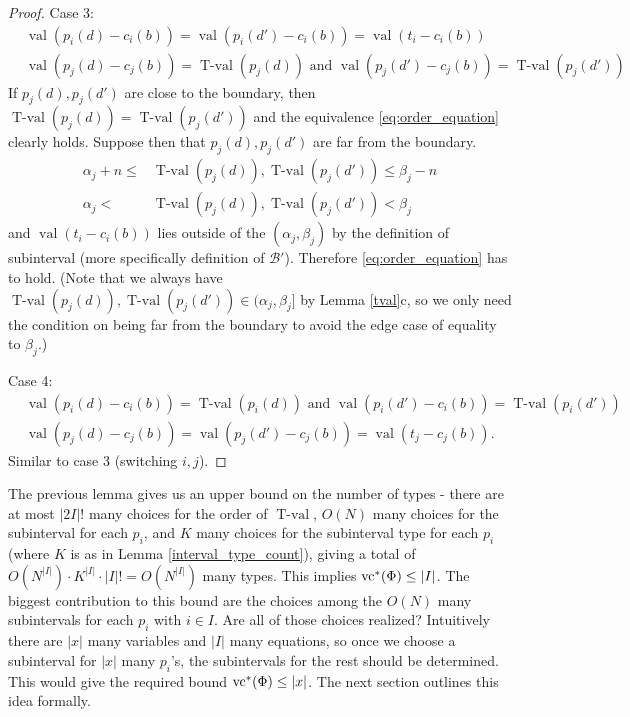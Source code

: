 \documentclass{amsart}
\newcommand{\BB}{\mathscr B}
\DeclareMathOperator{\vval}{val}
\DeclareMathOperator{\tval}{T-val}
\begin{document}
\begin{proof}
 Case 3:
  \begin{align*}
    &\vval (p_i(d) - c_i(b)) = \vval (p_i(d') - c_i(b)) = \vval(t_i - c_i(b)) \\
    &\vval (p_j(d) - c_j(b)) = \tval(p_j(d)) \text{ and } \vval (p_j(d') - c_j(b)) = \tval(p_j(d'))
  \end{align*}
  If $p_j(d), p_j(d')$ are close to the boundary,
  then $\tval(p_j(d)) = \tval(p_j(d'))$ and the equivalence \eqref{eq:order_equation} clearly holds.
  Suppose then that $p_j(d), p_j(d')$ are far from the boundary.
  \begin{align*}
    \alpha_j + n \leq &\tval(p_j(d)), \tval(p_j(d')) \leq \beta_j - n \\
    \alpha_j < &\tval(p_j(d)), \tval(p_j(d')) < \beta_j
  \end{align*}
  and $\vval(t_i - c_i(b))$ lies outside of the $(\alpha_j, \beta_j)$
  by the definition of subinterval (more specifically definition of $\BB'$).
  Therefore \eqref{eq:order_equation} has to hold.
  (Note that we always have $\tval(p_j(d)), \tval(p_j(d')) \in (\alpha_j, \beta_j]$ by Lemma \ref{tval}c, so 
  we only need the condition on being far from the boundary to avoid the edge case of equality to $\beta_j$.)

  Case 4:
  \begin{align*}
    &\vval (p_i(d) - c_i(b)) = \tval(p_i(d)) \text{ and } \vval (p_i(d') - c_i(b)) = \tval(p_i(d')) \\
    &\vval (p_j(d) - c_j(b)) = \vval (p_j(d') - c_j(b)) = \vval(t_j - c_j(b)).
  \end{align*}
  Similar to case 3 (switching $i,j$).
\end{proof}



  The previous lemma gives us an upper bound on the number of types - there are at most $|2I|!$ many choices for the order of $\tval$,
  $O(N)$ many choices for the subinterval for each $p_i$,
  and $K$ many choices for the subinterval type for each $p_i$ (where $K$ is as in Lemma \ref{interval_type_count}),
  giving a total of $O(N^{|I|}) \cdot K^{|I|} \cdot |I|! = O(N^{|I|})$ many types.
  This implies $\operatorname{vc}^*(\Phi) \leq |I|$.
  The biggest contribution to this bound are the choices among the $O(N)$ many subintervals for each $p_i$ with $i \in I$.
  Are all of those choices realized?
  Intuitively there are $|x|$ many variables and $|I|$ many equations,
  so once we choose a subinterval for $|x|$ many $p_i$'s, the subintervals for the rest should be determined.
  This would give the required bound $\operatorname{vc}^*(\Phi) \leq |x|$.
  The next section outlines this idea formally.
\end{document}
